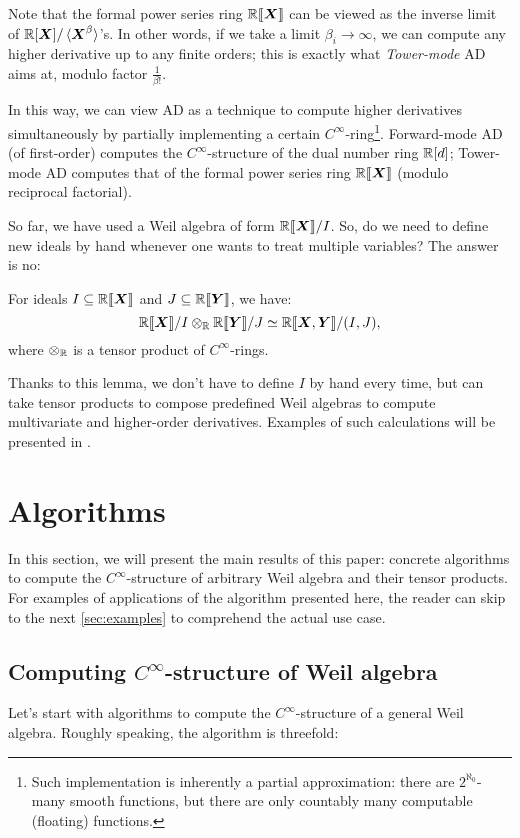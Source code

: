 Note that the formal power series ring $\mathord{\mathbb{R}\llbracket\boldsymbol{X}\rrbracket}$ can be viewed as the inverse limit of $\mathbb{R}[\boldsymbol{X}]/\braket{\boldsymbol{X}^\beta}$'s.
In other words, if we take a limit $\beta_i \to \infty$, we can compute any higher derivative up to any finite orders; this is exactly what \emph{Tower-mode} AD aims at, modulo factor $\frac{1}{\beta!}$.

In this way, we can view AD as a technique to compute higher derivatives simultaneously by partially implementing a certain $C^\infty$-ring\footnote{Such implementation is inherently a partial approximation: there are $2^{\aleph_0}$-many smooth functions, but there are only countably many computable (floating) functions.}.
Forward-mode AD (of first-order) computes the $C^\infty$-structure of the dual number ring $\mathbb{R}[d]$; Tower-mode AD computes that of the formal power series ring $\mathord{\mathbb{R}\llbracket\boldsymbol{X}\rrbracket}$ (modulo reciprocal factorial).

So far, we have used a Weil algebra of form $\mathord{\mathbb{R}\llbracket\boldsymbol{X}\rrbracket}/I$.
So, do we need to define new ideals by hand whenever one wants to treat multiple variables?
The answer is no:

\begin{lemma}
  \label{thm:quot-tensor}
  For ideals $I \subseteq \mathbb{R}\llbracket\boldsymbol{X}\rrbracket$ and $J \subseteq \mathbb{R}\llbracket{}\boldsymbol{Y}\rrbracket$, we have:
  \[
    \mathord{\mathbb{R}\llbracket\boldsymbol{X}\rrbracket}/I \otimes_{\mathbb{R}} \mathbb{R}\llbracket{}\boldsymbol{Y}\rrbracket/J \simeq
    \mathbb{R}\llbracket{}\boldsymbol{X}, \boldsymbol{Y}\rrbracket/(I, J),
  \]
  where $\otimes_{\mathbb{R}}$ is a tensor product of $C^\infty$-rings.
\end{lemma}
Thanks to this lemma, we don't have to define $I$ by hand every time, but can take tensor products to compose predefined Weil algebras to compute multivariate and higher-order derivatives.
Examples of such calculations will be presented in .

\section{Algorithms}\label{sec:alg}
In this section, we will present the main results of this paper: concrete algorithms to compute the $C^\infty$-structure of arbitrary Weil algebra and their tensor products.
For examples of applications of the algorithm presented here, the reader can skip to the next \cref{sec:examples} to comprehend the actual use case.

\subsection{Computing $C^\infty$-structure of Weil algebra}
\label{sec:general-weil-algs}
Let's start with algorithms to compute the $C^\infty$-structure of a general Weil algebra.
Roughly speaking, the algorithm is threefold:

